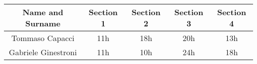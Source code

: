 \begin{tabular}{|c|c|c|c|c|}
    \hline
    \textbf{Name and Surname} & \textbf{Section 1} & \textbf{Section 2} & \textbf{Section 3} & \textbf{Section 4} \\
    \hline
    Tommaso Capacci & 11h & 18h & 20h & 13h \\
    \hline
    Gabriele Ginestroni & 11h & 10h & 24h & 18h \\
    \hline
\end{tabular}